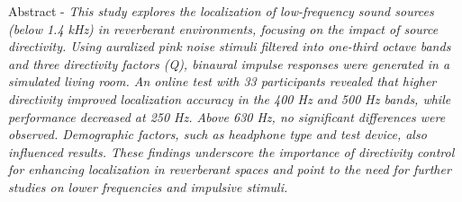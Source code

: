 \normalsize{ Abstract - \emph{This study explores the localization of low-frequency sound sources (below 1.4 kHz) in reverberant environments, focusing on the impact of source directivity. Using auralized pink noise stimuli filtered into one-third octave bands and three directivity factors (\textit{Q}), binaural impulse responses were generated in a simulated living room. An online test with 33 participants revealed that higher directivity improved localization accuracy in the 400 Hz and 500 Hz bands, while performance decreased at 250 Hz. Above 630 Hz, no significant differences were observed. Demographic factors, such as headphone type and test device, also influenced results. These findings underscore the importance of directivity control for enhancing localization in reverberant spaces and point to the need for further studies on lower frequencies and impulsive stimuli.} }
